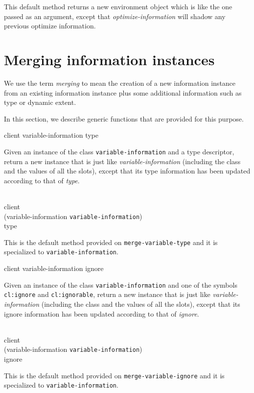This default method returns a new environment object which is like the
one passed as an argument, except that \textit{optimize-information}
will shadow any previous optimize information.

\section{Merging information instances}

We use the term \emph{merging} to mean the creation of a new
information instance from an existing information instance plus some
additional information such as type or dynamic extent.

In this section, we describe generic functions that are provided for
this purpose.

 {client variable-information type}

Given an instance of the class \texttt{variable-information} and a
type descriptor, return a new instance that is just like
\textit{variable-information} (including the class and the values of
all the slots), except that its type information has been updated
according to that of \textit{type}.

\\
           {client\\
            (variable-information {\tt variable-information})\\
            type}

This is the default method provided on \texttt{merge-variable-type}
and it is specialized to \texttt{variable-information}.

 {client variable-information ignore}

Given an instance of the class \texttt{variable-information} and one
of the symbols \texttt{cl:ignore} and \texttt{cl:ignorable},
return a new instance that is just like
\textit{variable-information} (including the class and the values of
all the slots), except that its ignore information has been updated
according to that of \textit{ignore}.

\\
           {client\\
            (variable-information {\tt variable-information})\\
            ignore}

This is the default method provided on \texttt{merge-variable-ignore}
and it is specialized to \texttt{variable-information}.

